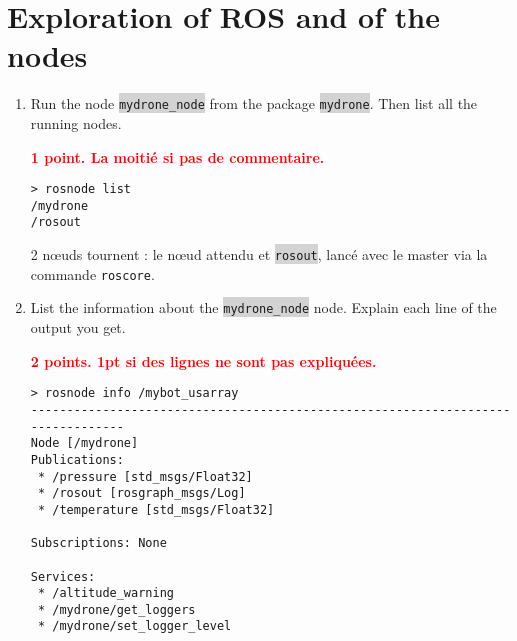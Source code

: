 \documentclass[10pt,a4paper,english]{exam}
\newcounter{mainmemorder}
\newcommand{\load}{\setcounter{enumi}{\value{mainmemorder}}}
\newcommand{\mytext}[1]{\colorbox{lightgray}{\texttt{#1}}}
\begin{document}
\section{Exploration of ROS and of the nodes}

\begin{enumerate}
	\load
	\item Run the node \mytext{mydrone\_node} from the package \mytext{mydrone}. Then list all the running nodes.
	      \begin{solution} \textbf{\textcolor{red}{1 point. La moitié si pas de commentaire.}}
		      \begin{verbatim}
> rosnode list
/mydrone
/rosout	      			
		\end{verbatim}
		      2 nœuds tournent : le nœud attendu et \mytext{rosout}, lancé avec le master via la
		      commande \texttt{roscore}.
	      \end{solution}
	\item List the information about the \mytext{mydrone\_node} node. Explain each line of the output
	      you get.

	      \begin{solution}\textbf{\textcolor{red}{2 points. 1pt si des lignes ne sont pas expliquées.}}
		      \begin{verbatim}
> rosnode info /mybot_usarray
--------------------------------------------------------------------------------
Node [/mydrone]
Publications:
 * /pressure [std_msgs/Float32]
 * /rosout [rosgraph_msgs/Log]
 * /temperature [std_msgs/Float32]

Subscriptions: None

Services:
 * /altitude_warning
 * /mydrone/get_loggers
 * /mydrone/set_logger_level


\end{verbatim}
\end{solution}
\end{enumerate}
\end{document}
